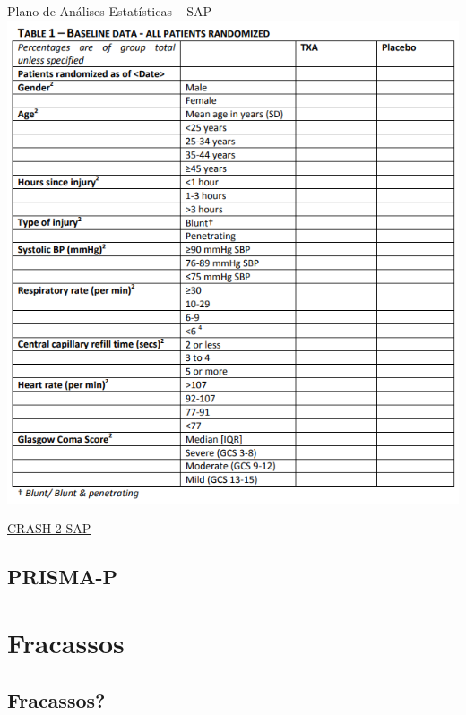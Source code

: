 \documentclass{beamer}
\begin{document}
\begin{frame}{Plano de Análises Estatísticas -- SAP}
  \centering
  \includegraphics[height=.9\textheight]{Planejamento/CRASH-SAP2}

  \vfill
  \scriptsize
  \hfill \href{http://www.crash2.lshtm.ac.uk/Images/SAP.pdf}{CRASH-2 SAP}
\end{frame}

\subsection{PRISMA-P}

\section{Fracassos}

\subsection{Fracassos?}
\end{document}
